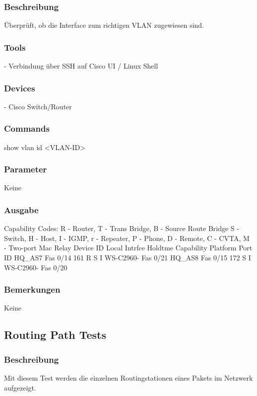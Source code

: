 \documentclass[a4,12pt]{scrartcl}
\begin{document}
\subsubsection{Beschreibung}
Überprüft, ob die Interface zum richtigen VLAN zugewiesen sind.
\subsubsection{Tools}
- Verbindung über SSH auf Cisco UI / Linux Shell
\subsubsection{Devices}
- Cisco Switch/Router
\subsubsection{Commands}
show vlan id <VLAN-ID>
\subsubsection{Parameter}
Keine
\subsubsection{Ausgabe}
Capability Codes: R - Router, T - Trans Bridge, B - Source Route Bridge\newline
                  S - Switch, H - Host, I - IGMP, r - Repeater, P - Phone,\newline
                  D - Remote, C - CVTA, M - Two-port Mac Relay\newline
Device ID        Local Intrfce     Holdtme    Capability  Platform  Port ID\newline
HQ_AS7           Fas 0/14          161             R S I  WS-C2960- Fas 0/21\newline
HQ_AS8           Fas 0/15          172              S I   WS-C2960- Fas 0/20\newline
\subsubsection{Bemerkungen}
Keine

\subsection{Routing Path Tests}
\subsubsection{Beschreibung}
Mit diesem Test werden die einzelnen Routingstationen eines Pakets im Netzwerk aufgezeigt. 
\end{document}
